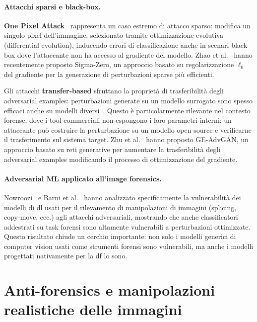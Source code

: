 \paragraph{Attacchi sparsi e black-box.}
\textbf{One Pixel Attack}~\cite{su2019onepixel} rappresenta un caso estremo di attacco sparso: modifica un singolo pixel dell'immagine, selezionato tramite ottimizzazione evolutiva (differential evolution), inducendo errori di classificazione anche in scenari black-box dove l'attaccante non ha accesso al gradiente del modello. Zhao et al.~\cite{zhao2024sigmazero} hanno recentemente proposto Sigma-Zero, un approccio basato su regolarizzazione $\ell_0$ del gradiente per la generazione di perturbazioni sparse più efficienti.

Gli attacchi \textbf{transfer-based} sfruttano la proprietà di trasferibilità degli adversarial examples: perturbazioni generate su un modello surrogato sono spesso efficaci anche su modelli diversi~\cite{yuan2019adversarial, akhtar2018threat}. Questo è particolarmente rilevante nel contesto forense, dove i tool commerciali non espongono i loro parametri interni: un attaccante può costruire la perturbazione su un modello open-source e verificarne il trasferimento sul sistema target. Zhu et al.~\cite{zhu2024geadvgan} hanno proposto GE-AdvGAN, un approccio basato su reti generative per aumentare la trasferibilità degli adversarial examples modificando il processo di ottimizzazione del gradiente.

\paragraph{Adversarial ML applicato all'image forensics.}
Nowroozi~\cite{nowroozi2020phd} e Barni et al.~\cite{barni2018cf} hanno analizzato specificamente la vulnerabilità dei modelli di \gls{dl} usati per il rilevamento di manipolazioni di immagini (splicing, copy-move, ecc.) agli attacchi adversariali, mostrando che anche classificatori addestrati su task forensi sono altamente vulnerabili a perturbazioni ottimizzate. Questo risultato chiude un cerchio importante: non solo i modelli generici di computer vision usati come strumenti forensi sono vulnerabili, ma anche i modelli progettati nativamente per la \gls{df} lo sono.


\section{Anti-forensics e manipolazioni realistiche delle immagini}
\label{sec:antiforensics}

